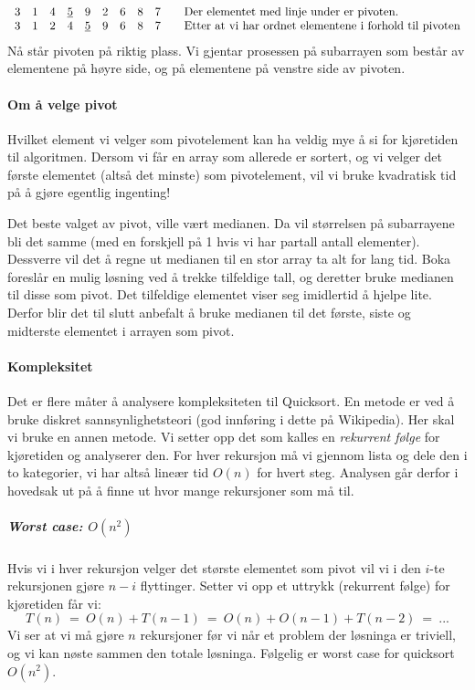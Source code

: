 \begin{eks} ~\newline
\[
  \begin{array}{c c c c c c c c c l}
    3&1&4&\underline{5}&9&2&6&8&7 &\quad \text{Der elementet med linje under er pivoten.}\\
    3&1&2&4&\underline{5}&9&6&8&7 &\quad \text{Etter at vi har ordnet elementene
    i forhold til pivoten}
  \end{array}
\]
Nå står pivoten på riktig plass. Vi gjentar prosessen på subarrayen som består
av elementene på høyre side, og på elementene på venstre side av pivoten.
\end{eks}

\paragraph{Om å velge pivot}
Hvilket element vi velger som pivotelement kan ha veldig mye å si for kjøretiden
til algoritmen. Dersom vi får en array som allerede er sortert, og vi velger det
første elementet (altså det minste) som pivotelement, vil vi bruke kvadratisk
tid på å gjøre egentlig ingenting!

Det beste valget av pivot, ville vært medianen. Da vil størrelsen på
subarrayene bli det samme (med en forskjell på 1 hvis vi har partall antall
elementer). Dessverre vil det å regne ut medianen til en stor array ta alt for
lang tid. Boka foreslår en mulig løsning ved å trekke tilfeldige tall, og
deretter bruke medianen til disse som pivot. Det tilfeldige elementet viser seg
imidlertid å hjelpe lite. Derfor blir det til slutt anbefalt å bruke medianen
til det første, siste og midterste elementet i arrayen som pivot.


\paragraph{Kompleksitet}
Det er flere måter å analysere kompleksiteten til Quicksort. En metode er ved å bruke diskret sannsynlighetsteori (god innføring i dette på Wikipedia). Her skal vi bruke en annen metode. Vi setter opp det som kalles en \emph{rekurrent følge} for kjøretiden og analyserer den. For hver rekursjon må vi gjennom lista og dele den i to kategorier, vi har altså lineær tid $ O(n) $ for hvert steg. Analysen går derfor i hovedsak ut på å finne ut hvor mange rekursjoner som må til. 

\subparagraph{Worst case: $ O(n^2) $}
Hvis vi i hver rekursjon velger det største elementet som pivot vil vi i den $ i $-te rekursjonen gjøre $ n-i $ flyttinger. Setter vi opp et uttrykk (rekurrent følge) for kjøretiden får vi:
\[ T(n) ~=~ O(n) + T(n-1) ~=~ O(n) + O(n-1) + T(n-2) ~=~ ... \]
Vi ser at vi må gjøre $ n $ rekursjoner før vi når et problem der løsninga er triviell, og vi kan nøste sammen den totale løsninga. Følgelig er worst case for quicksort $ O(n^2) $.

